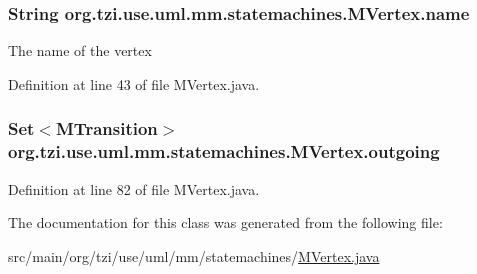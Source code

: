 \hypertarget{classorg_1_1tzi_1_1use_1_1uml_1_1mm_1_1statemachines_1_1_m_vertex_a9bb884a76140732039ff1fbf631b6575}{
\subsubsection[{name}]{\setlength{\rightskip}{0pt plus 5cm}String org.\-tzi.\-use.\-uml.\-mm.\-statemachines.\-M\-Vertex.\-name\hspace{0.3cm}{\ttfamily [protected]}}}\label{classorg_1_1tzi_1_1use_1_1uml_1_1mm_1_1statemachines_1_1_m_vertex_a9bb884a76140732039ff1fbf631b6575}
The name of the vertex 

Definition at line 43 of file M\-Vertex.\-java.

\hypertarget{classorg_1_1tzi_1_1use_1_1uml_1_1mm_1_1statemachines_1_1_m_vertex_a7646c20fade1913bed03c4b056e92b08}{
\subsubsection[{outgoing}]{\setlength{\rightskip}{0pt plus 5cm}Set$<${\bf M\-Transition}$>$ org.\-tzi.\-use.\-uml.\-mm.\-statemachines.\-M\-Vertex.\-outgoing\hspace{0.3cm}{\ttfamily [protected]}}}\label{classorg_1_1tzi_1_1use_1_1uml_1_1mm_1_1statemachines_1_1_m_vertex_a7646c20fade1913bed03c4b056e92b08}


Definition at line 82 of file M\-Vertex.\-java.



The documentation for this class was generated from the following file\-:\begin{DoxyCompactItemize}
\item 
src/main/org/tzi/use/uml/mm/statemachines/\hyperlink{_m_vertex_8java}{M\-Vertex.\-java}\end{DoxyCompactItemize}

